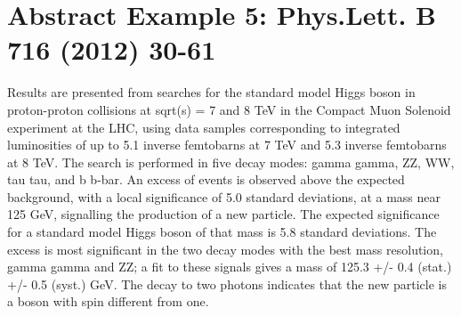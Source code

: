 \documentclass{article}
\begin{document}
\section{Abstract Example 5: Phys.Lett. B 716 (2012) 30-61}
Results are presented from searches for the standard model Higgs boson in proton-proton collisions at sqrt(s) = 7 and 8 TeV in the Compact Muon Solenoid experiment at the LHC, using data samples corresponding to integrated luminosities of up to 5.1 inverse femtobarns at 7 TeV and 5.3 inverse femtobarns at 8 TeV. The search is performed in five decay modes: gamma gamma, ZZ, WW, tau tau, and b b-bar. An excess of events is observed above the expected background, with a local significance of 5.0 standard deviations, at a mass near 125 GeV, signalling the production of a new particle. The expected significance for a standard model Higgs boson of that mass is 5.8 standard deviations. The excess is most significant in the two decay modes with the best mass resolution, gamma gamma and ZZ; a fit to these signals gives a mass of 125.3 +/- 0.4 (stat.) +/- 0.5 (syst.) GeV. The decay to two photons indicates that the new particle is a boson with spin different from one.
\end{document}
